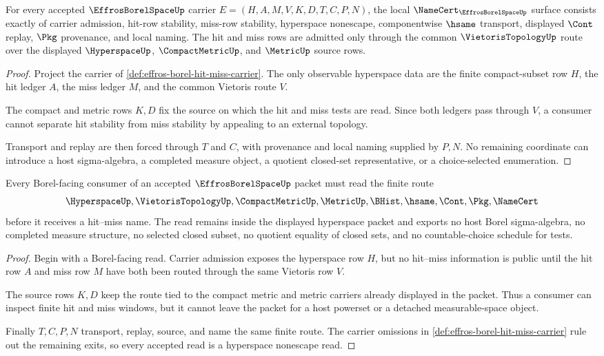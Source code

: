 \begin{theorem}
\label{thm:effros-borel-namecert-obligations}
For every accepted $\EffrosBorelSpaceUp$ carrier $E=(H,A,M,V,K,D,T,C,P,N)$, the local $\NameCert_{\EffrosBorelSpaceUp}$ surface consists exactly of carrier admission, hit-row stability, miss-row stability, hyperspace nonescape, componentwise $\hsame$ transport, displayed $\Cont$ replay, $\Pkg$ provenance, and local naming. The hit and miss rows are admitted only through the common $\VietorisTopologyUp$ route over the displayed $\HyperspaceUp$, $\CompactMetricUp$, and $\MetricUp$ source rows.
\end{theorem}
\begin{proof}
Project the carrier of \autoref{def:effros-borel-hit-miss-carrier}. The only observable hyperspace data are the finite compact-subset row $H$, the hit ledger $A$, the miss ledger $M$, and the common Vietoris route $V$.

The compact and metric rows $K,D$ fix the source on which the hit and miss tests are read. Since both ledgers pass through $V$, a consumer cannot separate hit stability from miss stability by appealing to an external topology.

Transport and replay are then forced through $T$ and $C$, with provenance and local naming supplied by $P,N$. No remaining coordinate can introduce a host sigma-algebra, a completed measure object, a quotient closed-set representative, or a choice-selected enumeration.
\end{proof}

\begin{theorem}
\label{thm:effros-borel-hyperspace-nonescape}
Every Borel-facing consumer of an accepted $\EffrosBorelSpaceUp$ packet must read the finite route
$$
\HyperspaceUp,\VietorisTopologyUp,\CompactMetricUp,\MetricUp,\BHist,\hsame,\Cont,\Pkg,\NameCert
$$
before it receives a hit--miss name. The read remains inside the displayed hyperspace packet and exports no host Borel sigma-algebra, no completed measure structure, no selected closed subset, no quotient equality of closed sets, and no countable-choice schedule for tests.
\end{theorem}
\begin{proof}
Begin with a Borel-facing read. Carrier admission exposes the hyperspace row $H$, but no hit--miss information is public until the hit row $A$ and miss row $M$ have both been routed through the same Vietoris row $V$.

The source rows $K,D$ keep the route tied to the compact metric and metric carriers already displayed in the packet. Thus a consumer can inspect finite hit and miss windows, but it cannot leave the packet for a host powerset or a detached measurable-space object.

Finally $T,C,P,N$ transport, replay, source, and name the same finite route. The carrier omissions in \autoref{def:effros-borel-hit-miss-carrier} rule out the remaining exits, so every accepted read is a hyperspace nonescape read.
\end{proof}

